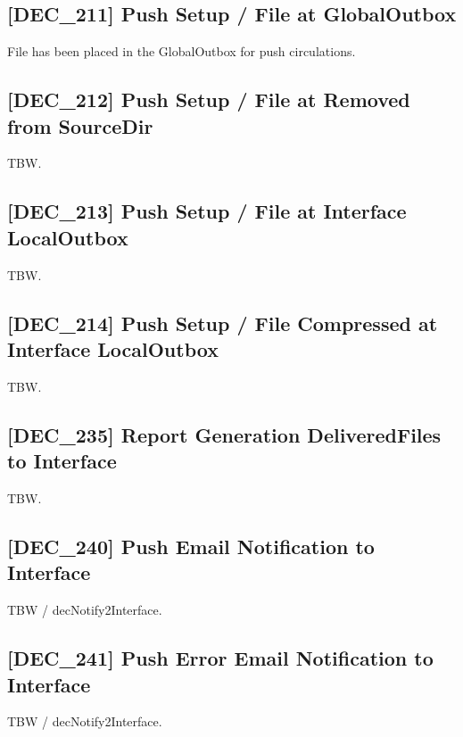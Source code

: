 \documentclass[dec_sum_main.tex]{subfiles}
\begin{document}
\label{DEC211}
\subsection{[DEC\_211] Push Setup / File at GlobalOutbox}
File has been placed in the GlobalOutbox for push circulations.

\label{DEC212}
\subsection{[DEC\_212] Push Setup / File at Removed from SourceDir}
TBW.

\label{DEC213}
\subsection{[DEC\_213] Push Setup / File at Interface LocalOutbox}
TBW.

\label{DEC214}
\subsection{[DEC\_214] Push Setup / File Compressed at Interface LocalOutbox}
TBW.

\label{DEC235}
\subsection{[DEC\_235] Report Generation DeliveredFiles to Interface}
TBW.

\label{DEC240}
\subsection{[DEC\_240] Push Email Notification to Interface}
TBW / decNotify2Interface.

\label{DEC241}
\subsection{[DEC\_241] Push Error Email Notification to Interface}
TBW / decNotify2Interface.

\label{DEC244}
\end{document}
